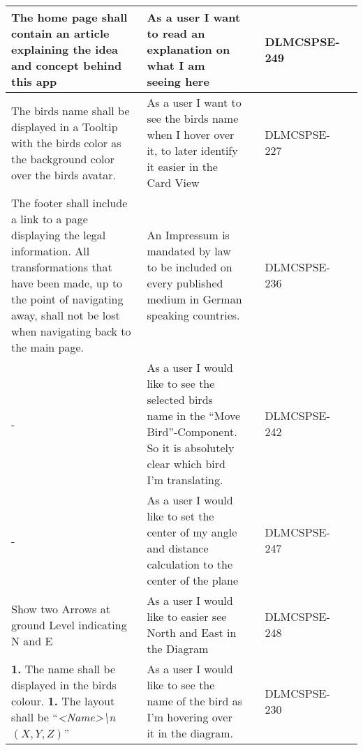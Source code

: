 \begin{xltabular}{\textwidth}{|X|X|M{1.8cm}|M{1.3cm}|M{1.3cm}|}
  The home page shall contain an article explaining the idea and concept behind this app & As a user I want to read an explanation on what I am seeing here &  & {\color{purpleT}\ttfamily DLMCSPSE-249} &  \\ \hline 
  The birds name shall be displayed in a Tooltip with the birds color as the background color over the birds avatar. & As a user I want to see the birds name when I hover over it, to later identify it easier in the Card View &  & {\color{purpleT}\ttfamily DLMCSPSE-227} &  \\ \hline 
  The footer shall include a link to a page displaying the legal information. \newline All transformations that have been made, up to the point of navigating away, shall not be lost when navigating back to the main page. & An Impressum is mandated by law to be included on every published medium in German speaking countries. &  & {\color{purpleT}\ttfamily DLMCSPSE-236} &  \\ \hline 
  - & As a user I would like to see the selected birds name in the “Move Bird”-Component. So it is absolutely clear which bird I’m translating. &  & {\color{purpleT}\ttfamily DLMCSPSE-242} &  \\ \hline 
  - & As a user I would like to set the center of my angle and distance calculation to the center of the plane &  & {\color{purpleT}\ttfamily DLMCSPSE-247} &  \\ \hline 
  Show two Arrows at ground Level indicating N and E & As a user I would like to easier see North and East in the Diagram &  & {\color{purpleT}\ttfamily DLMCSPSE-248} &  \\ \hline 
  \textbf{1.} The name shall be displayed in the birds colour. \newline\newline \textbf{1.} The layout shall be \enquote{\textit{\textless Name\textgreater \textbackslash n$(X,Y,Z)$}} & As a user I would like to see the name of the bird as I’m hovering over it in the diagram. &  & {\color{purpleT}\ttfamily DLMCSPSE-230} &  \\ \hline 

\end{xltabular}
